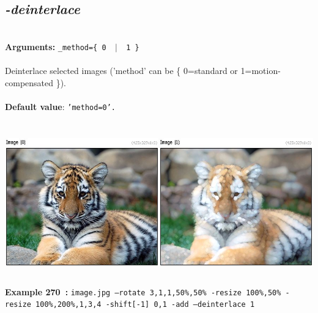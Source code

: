 \documentclass[a4paper,11pt,twoside]{book}
\begin{document}
\subsection{\emph{-deinterlace} }\vspace*{-0.5em}
~\\\textbf{Arguments: } 
{\small \texttt{\_method=\{ 0 ~$|$~ 1 \}}}\\~\\
Deinterlace selected images ('method' can be \{ 0=standard or 1=motion-compensated \}).
~\\~\\\textbf{Default value}: {\small \texttt{'method=0'.}}
\begin{center}\includegraphics[keepaspectratio=true,height=7cm,width=\textwidth]{img/gmic_def270.jpg}\\
{\footnotesize \textbf{Example 270~:} \texttt{image.jpg --rotate 3,1,1,50\%,50\% -resize 100\%,50\% -resize 100\%,200\%,1,3,4 -shift[-1] 0,1 -add --deinterlace 1}}
\end{center}
\end{document}
